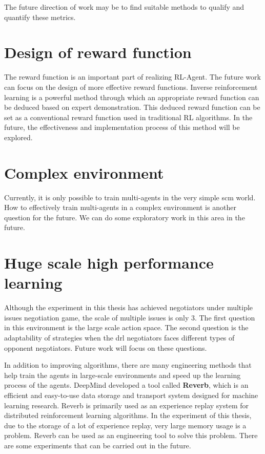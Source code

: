 The future direction of work may be to find suitable methods to qualify and quantify these metrics.

\section{Design of reward function}
The reward function is an important part of realizing RL-Agent. The future work can focus on the design of more effective reward functions. Inverse reinforcement learning is a powerful method through which an appropriate reward function can be deduced based on expert demonstration. This deduced reward function can be set as a conventional reward function used in traditional RL algorithms. In the future, the effectiveness and implementation process of this method will be explored.

\section{Complex environment}
Currently, it is only possible to train multi-agents in the very simple \gls{scm} world. How to effectively train multi-agents in a complex environment is another question for the future. We can do some exploratory work in this area in the future.

\section{Huge scale high performance learning}
Although the experiment in this thesis has achieved negotiators under multiple issues negotiation game, the scale of multiple issues is only 3. The first question in this environment is the large scale action space. The second question is the adaptability of strategies when the \gls{drl} negotiators faces different types of opponent negotiators. Future work will focus on these questions.
 
In addition to improving algorithms, there are many engineering methods that help train the agents in large-scale environments and speed up the learning process of the agents. DeepMind developed a tool called \textbf{Reverb}\parencite{cassirer2021reverb}, which is an efficient and easy-to-use data storage and transport system designed for machine learning research. Reverb is primarily used as an experience replay system for distributed reinforcement learning algorithms. In the experiment of this thesis, due to the storage of a lot of experience replay, very large memory usage is a problem. Reverb can be used as an engineering tool to solve this problem. There are some experiments that can be carried out in the future.
